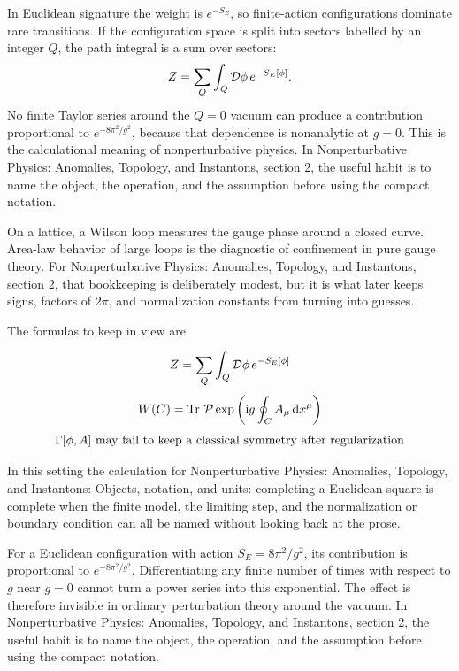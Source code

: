 In Euclidean signature the weight is \(e^{-S_E}\), so finite-action configurations dominate rare transitions.  If the configuration space is split into sectors labelled by an integer \(Q\), the path integral is a sum over sectors:
\[
  Z=\sum_Q\int_Q\mathcal D\phi\,e^{-S_E[\phi]}.
\]
No finite Taylor series around the \(Q=0\) vacuum can produce a contribution proportional to \(e^{-8\pi^2/g^2}\), because that dependence is nonanalytic at \(g=0\).  This is the calculational meaning of nonperturbative physics.  In Nonperturbative Physics: Anomalies, Topology, and Instantons, section 2, the useful habit is to name the object, the operation, and the assumption before using the compact notation.

On a lattice, a Wilson loop measures the gauge phase around a closed curve.  Area-law behavior of large loops is the diagnostic of confinement in pure gauge theory.  For Nonperturbative Physics: Anomalies, Topology, and Instantons, section 2, that bookkeeping is deliberately modest, but it is what later keeps signs, factors of \(2\pi\), and normalization constants from turning into guesses.

The formulas to keep in view are

\[
  Z=\sum_Q\int_Q\mathcal D\phi\,e^{-S_E[\phi]}
\]
\[
  W(C)=\operatorname{Tr}\,\mathcal P\exp\left(\mathrm i g\oint_C A_\mu\,\mathrm d x^\mu\right)
\]
\[
  \Gamma[\phi,A]\hbox{ may fail to keep a classical symmetry after regularization}
\]

In this setting the calculation for Nonperturbative Physics: Anomalies, Topology, and Instantons: Objects, notation, and units: completing a Euclidean square is complete when the finite model, the limiting step, and the normalization or boundary condition can all be named without looking back at the prose.




\begin{example}
For a Euclidean configuration with action \(S_E=8\pi^2/g^2\), its contribution is proportional to \(e^{-8\pi^2/g^2}\).  Differentiating any finite number of times with respect to \(g\) near \(g=0\) cannot turn a power series into this exponential.  The effect is therefore invisible in ordinary perturbation theory around the vacuum.  In Nonperturbative Physics: Anomalies, Topology, and Instantons, section 2, the useful habit is to name the object, the operation, and the assumption before using the compact notation.
\end{example}



